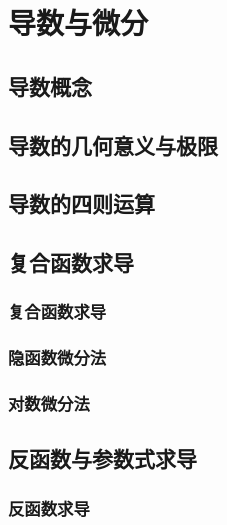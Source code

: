 

\chapter{导数与微分}\label{ch:4}
\section{导数概念}
\begin{exercise}
\item
\end{exercise}
\section{导数的几何意义与极限}
\begin{exercise}
\item
\end{exercise}
\section{导数的四则运算}
\begin{exercise}
\item
\end{exercise}
\section{复合函数求导}
\subsection{复合函数求导}
\subsection{隐函数微分法}
\subsection{对数微分法}
\begin{exercise}
\item
\end{exercise}
\section{反函数与参数式求导}
\subsection{反函数求导}
